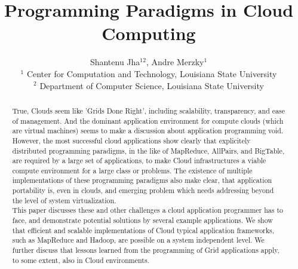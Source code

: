 \documentclass{article}
\begin{document}
\title{\large Programming Paradigms in Cloud Computing}

\author{Shantenu Jha$^{12}$,
        Andre Merzky$^1$\\[1em]
        $^1$\small
          Center for Computation and Technology, 
          Louisiana State University\\
        $^2$ \small
          Department of Computer Science, 
          Louisiana State University
       }

\maketitle

\begin{abstract}

  \noindent
  True, Clouds seem like 'Grids Done Right', including scalability,
  transparency, and ease of management.  And the dominant application
  environment for compute clouds (which are virtual machines) seems to
  make a discussion about application programming void.  However, the
  most successful cloud applications show clearly that explicitely
  distributed programming paradigms, in the like of MapReduce,
  AllPairs, and BigTable, are required by a large set of applications,
  to make Cloud infrastructures a viable compute environment for a
  large class or problems.  The existence of multiple implementations
  of these programming paradigms also make clear, that application
  portability is, even in clouds, and emerging problem which needs
  addressing beyond the level of system virtualization.\\[-0.5em]

  \noindent
  This paper discusses these and other challenges a cloud application
  programmer has to face, and demonstrate potential solutions by
  several example applications.  We show that efficient and scalable
  implementations of Cloud typical application frameworks, such as
  MapReduce and Hadoop, are possible on a system independent level.
  We further discuss that lessons learned from the programming of Grid
  applications apply, to some extent, also in Cloud environments.

\end{abstract}

\end{document}
